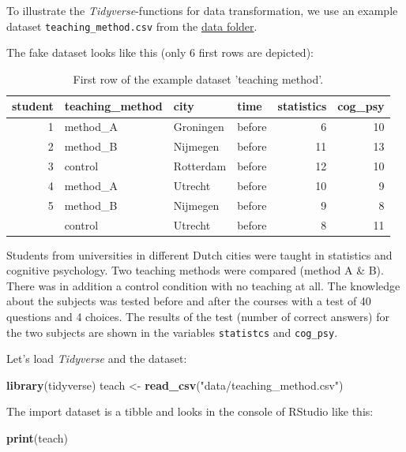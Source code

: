 \documentclass[
]{scrartcl}
\newenvironment{Shaded}{\begin{snugshade}}{\end{snugshade}}
\newcommand{\FunctionTok}[1]{\textcolor[rgb]{0.13,0.29,0.53}{\textbf{#1}}}
\newcommand{\NormalTok}[1]{#1}
\newcommand{\OtherTok}[1]{\textcolor[rgb]{0.56,0.35,0.01}{#1}}
\newcommand{\StringTok}[1]{\textcolor[rgb]{0.31,0.60,0.02}{#1}}
\begin{document}
To illustrate the \emph{Tidyverse}-functions for data transformation, we use an example dataset \texttt{teaching\_method.csv} from the \href{https://surfdrive.surf.nl/s/EBXYmGdYHiY9eoG}{data folder}.

The fake dataset looks like this (only 6 first rows are depicted):

\begin{table}

\caption{\label{tab:unnamed-chunk-148}First row of the example dataset 'teaching method'.}
\centering
\begin{tabular}[t]{rlllrr}
\toprule
student & teaching\_method & city & time & statistics & cog\_psy\\
\midrule
1 & method\_A & Groningen & before & 6 & 10\\
2 & method\_B & Nijmegen & before & 11 & 13\\
3 & control & Rotterdam & before & 12 & 10\\
4 & method\_A & Utrecht & before & 10 & 9\\
5 & method\_B & Nijmegen & before & 9 & 8\\
\addlinespace
6 & control & Utrecht & before & 8 & 11\\
\bottomrule
\end{tabular}
\end{table}

Students from universities in different Dutch cities were taught in statistics and cognitive psychology. Two teaching methods were compared (method A \& B). There was in addition a control condition with no teaching at all. The knowledge about the subjects was tested before and after the courses with a test of 40 questions and 4 choices. The results of the test (number of correct answers) for the two subjects are shown in the variables \texttt{statistcs} and \texttt{cog\_psy}.

Let's load \emph{Tidyverse} and the dataset:

\begin{Shaded}
\begin{Highlighting}[]
\FunctionTok{library}\NormalTok{(tidyverse)}
\NormalTok{teach }\OtherTok{\textless{}{-}} \FunctionTok{read\_csv}\NormalTok{(}\StringTok{"data/teaching\_method.csv"}\NormalTok{)}
\end{Highlighting}
\end{Shaded}

The import dataset is a tibble and looks in the console of RStudio like this:

\begin{Shaded}
\begin{Highlighting}[]
\FunctionTok{print}\NormalTok{(teach)}
\end{Highlighting}
\end{Shaded}
\end{document}

